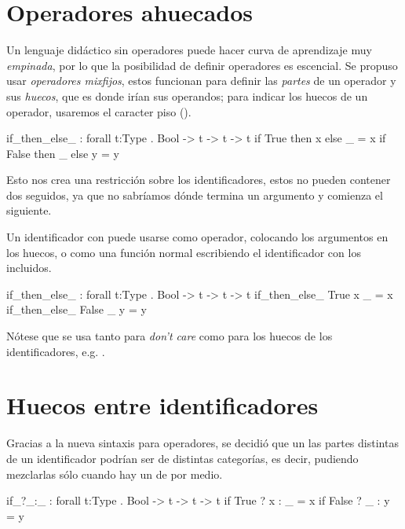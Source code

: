{\section{Operadores ahuecados}

\begin{designfr}
Un lenguaje didáctico sin operadores puede hacer curva de aprendizaje muy \emph{empinada}, por lo que la posibilidad de definir operadores es escencial. Se propuso usar \emph{operadores mixfijos}, estos funcionan para definir las \emph{partes} de un operador y sus \emph{huecos}, que es donde irían sus operandos; para indicar los huecos de un operador, usaremos el caracter piso (\inlinecode{\_}).

\begin{anglercode}
if_then_else_ : forall t:Type . Bool -> t -> t -> t
if True  then x else _ = x
if False then _ else y = y
\end{anglercode}

Esto nos crea una restricción sobre los identificadores, estos no pueden contener dos \inlinecode{\_} seguidos, ya que no sabríamos dónde termina un argumento y comienza el siguiente.

Un identificador con \inlinecode{\_} puede usarse como operador, colocando los argumentos en los huecos, o como una función normal escribiendo el identificador con los \inlinecode{\_} incluidos.

\begin{anglercode}
if_then_else_ : forall t:Type . Bool -> t -> t -> t
if_then_else_ True  x _ = x
if_then_else_ False _ y = y
\end{anglercode}

Nótese que se usa \inlinecode{\_} tanto para \emph{don't care} como para los huecos de los identificadores, e.g. .
\end{designfr}

\section{Huecos entre identificadores}

\begin{designfr}
Gracias a la nueva sintaxis para operadores, se decidió que un las partes distintas de un identificador podrían ser de distintas categorías, es decir, pudiendo mezclarlas sólo cuando hay un \inlinecode{\_} de por medio.

\begin{anglercode}
if_?_:_ : forall t:Type . Bool -> t -> t -> t
if True  ? x : _ = x
if False ? _ : y = y
\end{anglercode}
\end{designfr}

}
